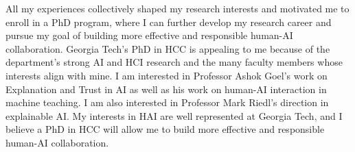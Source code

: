 


All my experiences collectively shaped my research interests and motivated me to enroll in a PhD program, where I can further develop my research career and pursue my goal of building more effective and responsible human-AI collaboration. 
Georgia Tech's PhD in HCC is appealing to me because of the department's strong AI and HCI research and the many faculty members whose interests align with mine.
I am interested in Professor Ashok Goel's work on Explanation and Trust in AI as well as his work on human-AI interaction in machine teaching. 
I am also interested in Professor Mark Riedl's direction in explainable AI. 
My interests in HAI are well represented at Georgia Tech, and I believe a PhD in HCC will allow me to build more effective and responsible human-AI collaboration.